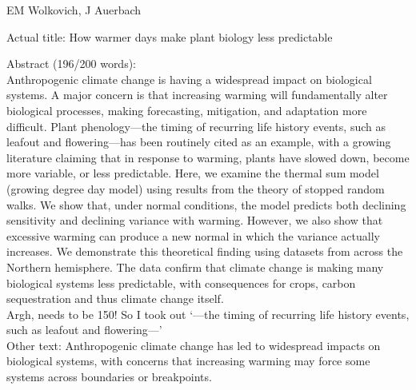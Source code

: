\documentclass[11pt]{article}
\begin{document}
\renewcommand{\refname}{\CHead{}}

EM Wolkovich, J Auerbach 

Actual title: How warmer days make plant biology less predictable


Abstract (196/200 words): \\
Anthropogenic climate change is having a widespread impact on biological systems. A major concern is that increasing warming will fundamentally alter biological processes, making forecasting, mitigation, and adaptation more difficult. Plant phenology—the timing of recurring life history events, such as leafout and flowering—has been routinely cited as an example, with a growing literature claiming that in response to warming, plants have slowed down, become more variable, or less predictable. Here, we examine the thermal sum model (growing degree day model) using results from the theory of stopped random walks. We show that, under normal conditions, the model predicts both declining sensitivity and declining variance with warming. However, we also show that excessive warming can produce a new normal in which the variance actually increases. We demonstrate this theoretical finding using datasets from across the Northern hemisphere. The data confirm that climate change is making many biological systems less predictable, with consequences for crops, carbon sequestration and thus climate change itself. \\

Argh, needs to be 150! So I took out `—the timing of recurring life history events, such as leafout and flowering—'\\


Other text: 
Anthropogenic climate change has led to widespread impacts on biological systems, with concerns that increasing warming may force some systems across boundaries or breakpoints. 
\end{document}
